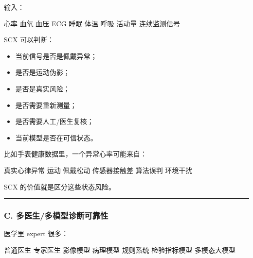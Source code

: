 \documentclass[
  12pt,
]{ctexart}
\newenvironment{Shaded}{}{}
\newcommand{\NormalTok}[1]{#1}
\providecommand{\tightlist}{%
  \setlength{\itemsep}{0pt}\setlength{\parskip}{0pt}}
\begin{document}
输入：

\begin{Shaded}
\begin{Highlighting}[]
\NormalTok{心率}
\NormalTok{血氧}
\NormalTok{血压}
\NormalTok{ECG}
\NormalTok{睡眠}
\NormalTok{体温}
\NormalTok{呼吸}
\NormalTok{活动量}
\NormalTok{连续监测信号}
\end{Highlighting}
\end{Shaded}

SCX 可以判断：

\begin{itemize}
\tightlist
\item
  当前信号是否是佩戴异常；
\item
  是否是运动伪影；
\item
  是否是真实风险；
\item
  是否需要重新测量；
\item
  是否需要人工/医生复核；
\item
  当前模型是否在可信状态。
\end{itemize}

比如手表健康数据里，一个异常心率可能来自：

\begin{Shaded}
\begin{Highlighting}[]
\NormalTok{真实心律异常}
\NormalTok{运动}
\NormalTok{佩戴松动}
\NormalTok{传感器接触差}
\NormalTok{算法误判}
\NormalTok{环境干扰}
\end{Highlighting}
\end{Shaded}

SCX 的价值就是区分这些状态风险。

\begin{center}\rule{0.5\linewidth}{0.5pt}\end{center}

\subsubsection{C.
多医生/多模型诊断可靠性}\label{c.-ux591aux533bux751fux591aux6a21ux578bux8bcaux65adux53efux9760ux6027}

医学里 expert 很多：

\begin{Shaded}
\begin{Highlighting}[]
\NormalTok{普通医生}
\NormalTok{专家医生}
\NormalTok{影像模型}
\NormalTok{病理模型}
\NormalTok{规则系统}
\NormalTok{检验指标模型}
\NormalTok{多模态大模型}
\end{Highlighting}
\end{Shaded}
\end{document}
